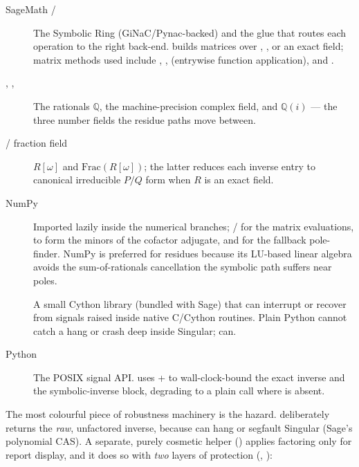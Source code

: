 \begin{description}
  \item[SageMath / ] The Symbolic Ring (GiNaC/Pynac-backed) and the glue
        that routes each operation to the right back-end. 
        builds matrices over , , or an exact field; matrix
        methods used include , , 
        (entrywise function application), and .
  \item[, , ] The rationals
        $\mathbb{Q}$, the machine-precision complex field, and $\mathbb{Q}(i)$ ---
        the three number fields the residue paths move between.
  \item[ / fraction field] $R[\omega]$ and
        $\mathrm{Frac}(R[\omega])$; the latter reduces each inverse entry to
        canonical irreducible $P/Q$ form when $R$ is an exact field.
  \item[NumPy] Imported lazily inside the numerical branches; 
        /  for the matrix evaluations,  to form
        the minors of the cofactor adjugate, and  for the
        fallback pole-finder. NumPy is preferred for residues because its LU-based
        linear algebra avoids the sum-of-rationals cancellation the symbolic path
        suffers near poles.
  \item[] A small Cython library (bundled with Sage) that can
        interrupt or recover from signals raised inside native C/Cython routines.
        Plain Python  cannot catch a hang or crash deep inside
        Singular;  can.
  \item[Python ] The POSIX signal API. 
        uses  +  to wall-clock-bound the exact
        inverse and the symbolic-inverse block, degrading to a plain call where
         is absent.
\end{description}

The most colourful piece of robustness machinery is the  hazard.
 deliberately returns the \emph{raw}, unfactored inverse,
because  can hang or segfault Singular (Sage's polynomial CAS). A
separate, purely cosmetic helper 
() applies factoring only for report display,
and it does so with \emph{two} layers of protection (,
):

